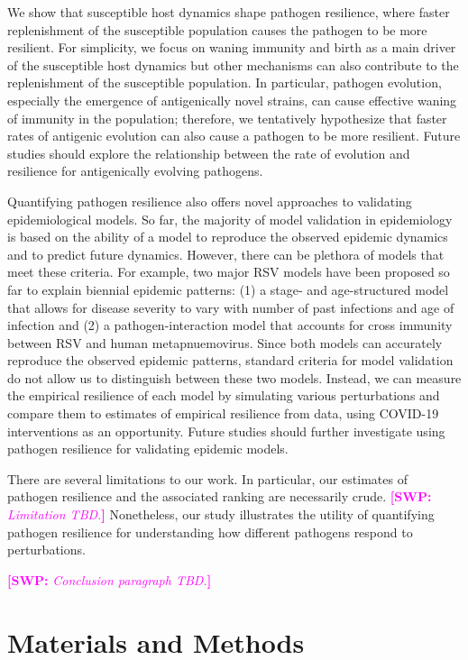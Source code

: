 \documentclass[12pt]{article}
\newcommand{\comment}{\showcomment}
\newcommand{\showcomment}[3]{\textcolor{#1}{\textbf{[#2: }\textsl{#3}\textbf{]}}}
\newcommand{\swp}[1]{\comment{magenta}{SWP}{#1}}
\begin{document}
We show that susceptible host dynamics shape pathogen resilience, where faster replenishment of the susceptible population causes the pathogen to be more resilient.
For simplicity, we focus on waning immunity and birth as a main driver of the susceptible host dynamics but other mechanisms can also contribute to the replenishment of the susceptible population.
In particular, pathogen evolution, especially the emergence of antigenically novel strains, can cause effective waning of immunity in the population;
therefore, we tentatively hypothesize that faster rates of antigenic evolution can also cause a pathogen to be more resilient.
Future studies should explore the relationship between the rate of evolution and resilience for antigenically evolving pathogens.

Quantifying pathogen resilience also offers novel approaches to validating epidemiological models.
So far, the majority of model validation in epidemiology is based on the ability of a model to reproduce the observed epidemic dynamics and to predict future dynamics.
However, there can be plethora of models that meet these criteria.
For example, two major RSV models have been proposed so far to explain biennial epidemic patterns: (1) a stage- and age-structured model that allows for disease severity to vary with number of past infections and age of infection and (2) a pathogen-interaction model that accounts for cross immunity between RSV and human metapnuemovirus.
Since both models can accurately reproduce the observed epidemic patterns, standard criteria for model validation do not allow us to distinguish between these two models.
Instead, we can measure the empirical resilience of each model by simulating various perturbations and compare them to estimates of empirical resilience from data, using COVID-19 interventions as an opportunity.
Future studies should further investigate using pathogen resilience for validating epidemic models.

There are several limitations to our work.
In particular, our estimates of pathogen resilience and the associated ranking are necessarily crude.
\swp{Limitation TBD.}
Nonetheless, our study illustrates the utility of quantifying pathogen resilience for understanding how different pathogens respond to perturbations.

\swp{Conclusion paragraph TBD.}

\section*{Materials and Methods}
\end{document}
